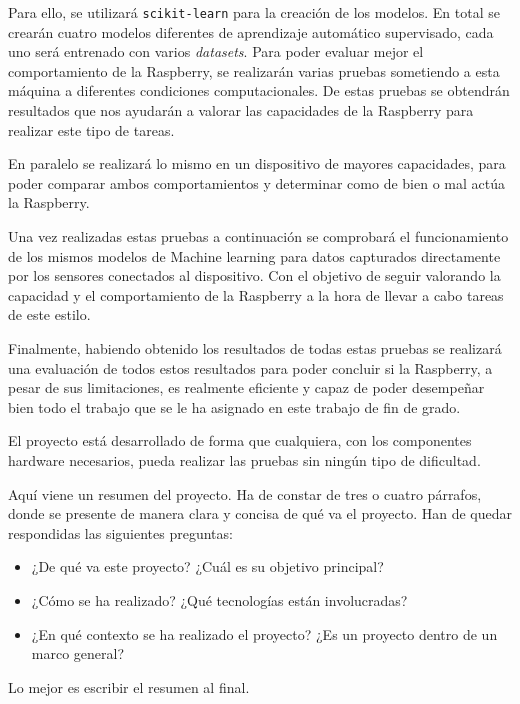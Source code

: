 \documentclass[a4paper, 12pt]{book}
\begin{document}
Para ello, se utilizará \texttt{scikit-learn} para la creación de los modelos. En total se crearán cuatro modelos diferentes de aprendizaje automático supervisado, cada uno será entrenado con varios \textit{datasets}. Para poder evaluar mejor el comportamiento de la Raspberry, se realizarán varias pruebas sometiendo a esta máquina a diferentes condiciones computacionales. De estas pruebas se obtendrán resultados que nos ayudarán a valorar las capacidades de la Raspberry para realizar este tipo de tareas. 

En paralelo se realizará lo mismo en un dispositivo de mayores capacidades, para poder comparar ambos comportamientos y determinar como de bien o mal actúa la Raspberry.

Una vez realizadas estas pruebas a continuación se comprobará el funcionamiento de los mismos modelos de Machine learning para datos capturados directamente por los sensores conectados al dispositivo. Con el objetivo de seguir valorando la capacidad y el comportamiento de la Raspberry a la hora de llevar a cabo tareas de este estilo.

Finalmente, habiendo obtenido los resultados de todas estas pruebas se realizará una evaluación de todos estos resultados para poder concluir si la Raspberry, a pesar de sus limitaciones, es realmente eficiente y capaz de poder desempeñar bien todo el trabajo que se le ha asignado en este trabajo de fin de grado.

El proyecto está desarrollado de forma que cualquiera, con los componentes hardware necesarios, pueda realizar las pruebas sin ningún tipo de dificultad.

Aquí viene un resumen del proyecto.
Ha de constar de tres o cuatro párrafos, donde se presente de manera clara y concisa de qué va el proyecto. 
Han de quedar respondidas las siguientes preguntas:

\begin{itemize}
  \item ¿De qué va este proyecto? ¿Cuál es su objetivo principal?
  \item ¿Cómo se ha realizado? ¿Qué tecnologías están involucradas?
  \item ¿En qué contexto se ha realizado el proyecto? ¿Es un proyecto dentro de un marco general?
\end{itemize}

Lo mejor es escribir el resumen al final.

\end{document}
